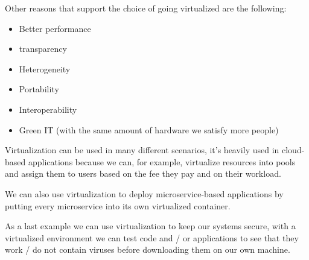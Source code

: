 Other reasons that support the choice of going virtualized are the following:
\begin{itemize}
    \item Better performance
    \item transparency
    \item Heterogeneity
    \item Portability
    \item Interoperability
    \item Green IT (with the same amount of hardware we satisfy more people)
\end{itemize}
Virtualization can be used in many different scenarios, it's heavily used in cloud-based applications because we can, for example, virtualize resources into pools and assign them to users based on the fee they pay and on their workload.

We can also use virtualization to deploy microservice-based applications by putting every microservice into its own virtualized container.

As a last example we can use virtualization to keep our systems secure, with a virtualized environment we can test code and / or applications to see that they work / do not contain viruses before downloading them on our own machine.


